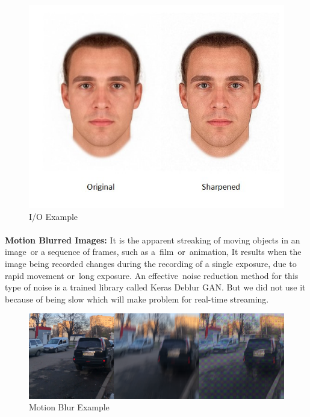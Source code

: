 \begin{figure}[H]
	\centering
	\includegraphics[width=\linewidth]{images/Sharpened.jpg}
	\caption{I/O Example}
\end{figure}

\paragraph{}
\textbf{Motion Blurred Images:}\newline
It is the apparent streaking of moving objects in an image or a sequence of frames, such as a film or animation, It results when the image being recorded changes during the recording of a single exposure, due to rapid movement or long exposure.\newline
An effective noise reduction method for this type of noise is a trained library called Keras Deblur GAN.\newline
But we did not use it because of being slow which will make problem for real-time streaming.
\begin{figure}[H]
	\centering
	\includegraphics[width=\linewidth]{images/motion_blur.png}
	\caption{Motion Blur Example}
\end{figure}
